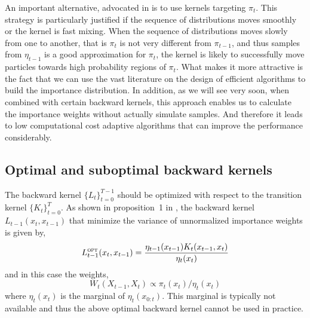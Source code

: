 An important alternative, advocated in \cite{DelMoral:2006hc} is to use \mcmc
kernels targeting $\pi_t$. This strategy is particularly justified if the
sequence of distributions moves smoothly or the kernel is fast mixing. When the
sequence of distributions moves slowly from one to another, that is $\pi_t$
is not very different from $\pi_{t-1}$, and thus samples from $\eta_{t-1}$ is
a good approximation for $\pi_t$, the kernel is likely to successfully move
particles towards high probability regions of $\pi_t$. What makes it more
attractive is the fact that we can use the vast literature on the design of
efficient \mcmc algorithms to build the importance distribution. In addition,
as we will see very soon, when combined with certain backward kernels, this
approach enables us to calculate the importance weights without actually
simulate samples. And therefore it leads to low computational cost adaptive
algorithms that can improve the performance considerably.

\subsection{Optimal and suboptimal backward kernels}
\label{sub:Optimal and suboptimal backward kernels}

The backward kernel $\{L_t\}_{t=0}^{T-1}$ should be optimized with respect to
the transition kernel $\{K_t\}_{t=0}^T$. As shown in proposition~1{} in
\cite{DelMoral:2006hc}, the backward kernel $L_{t-1}(x_t, x_{t-1})$ that
minimize the variance of unnormalized importance weights is given by,
\begin{equation}
  L_{t-1}^{\text{\textsc{opt}}}(x_t,x_{t-1}) =
  \frac{\eta_{t-1}(x_{t-1})K_t(x_{t-1},x_t)}{\eta_t(x_t)}
\end{equation}
and in this case the weights,
\begin{equation}
  W_t(X_{t-1},X_t) \propto \pi_t(x_t)/\eta_t(x_t)
\end{equation}
where $\eta_t(x_t)$ is the marginal of $\eta_t(x_{0:t})$. This marginal is
typically not available and thus the above optimal backward kernel cannot be
used in practice.

